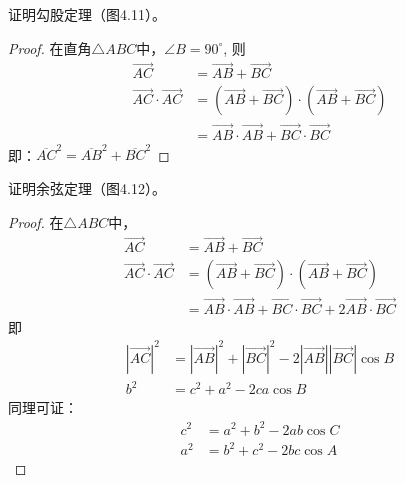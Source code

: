 \begin{example}
    证明勾股定理（图4.11）。
\end{example}

\begin{proof}
    在直角$\triangle ABC$中，$\angle B=90^{\circ}$, 则
\[\begin{split}
   \Vec{AC}&=\Vec{AB}+\Vec{BC}\\
   \Vec{AC}\cdot \Vec{AC}&= \left(\Vec{AB}+\Vec{BC}\right)\cdot \left(\Vec{AB}+\Vec{BC}\right)\\
   &=\Vec{AB}\cdot \Vec{AB}+\Vec{BC}\cdot \Vec{BC}
\end{split}\]
即：$\overline{AC}^2=\overline{AB}^2+\overline{BC}^2$
\end{proof}

\begin{figure}[htp]\centering
    \begin{minipage}[t]{0.48\textwidth}
    \centering
{}
    \caption{}
    \end{minipage}
    \begin{minipage}[t]{0.48\textwidth}
    \centering
    \caption{}
    \end{minipage}
    \end{figure}


\begin{example}
    证明余弦定理（图4.12）。
\end{example}

\begin{proof}
在$\triangle ABC$中，
\[\begin{split}
    \Vec{AC}&=\Vec{AB}+\Vec{BC}\\
    \Vec{AC}\cdot  \Vec{AC}&=\left(\Vec{AB}+\Vec{BC}\right)\cdot \left(\Vec{AB}+\Vec{BC}\right)\\
    &=\Vec{AB}\cdot \Vec{AB}+\Vec{BC}\cdot \Vec{BC}+2\Vec{AB}\cdot \Vec{BC}
\end{split}\]
即
\[\begin{split}
    |\Vec{AC}|^2&=|\Vec{AB}|^2+|\Vec{BC}|^2-2|\Vec{AB}||\Vec{BC}|\cos B\\
b^2&=c^2+a^2-2ca\cos B
\end{split}\]
同理可证：
\[\begin{split}
  c^2&=a^2+b^2-2ab\cos C\\
a^2&=b^2+c^2-2bc\cos A  
\end{split}\]
\end{proof}

